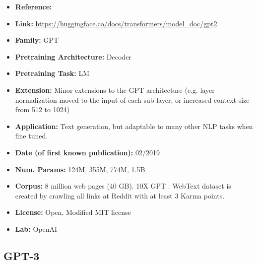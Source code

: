 \documentclass{article}
\begin{document}
            \begin{itemize}
                \item \textbf{Reference:} 
                \item \textbf{Link:} \url{https://huggingface.co/docs/transformers/model_doc/gpt2}
                \item \textbf{Family:} GPT 
                \item \textbf{Pretraining Architecture:} Decoder
                \item \textbf{Pretraining Task:} LM
                \item \textbf{Extension:} Minor extensions to the GPT architecture (e.g. layer normalization moved to the input of each sub-layer, or increased context size from 512 to 1024)  
                \item \textbf{Application:} Text generation, but adaptable to many other NLP tasks when fine tuned.
                \item \textbf{Date (of first known publication):} 02/2019
                \item \textbf{Num. Params:} 124M, 355M, 774M, 1.5B
                \item \textbf{Corpus:} 8 million web pages (40 GB). 10X GPT . WebText dataset is created by crawling all links at Reddit with at least 3 Karma points.
                \item \textbf{License:} Open, Modified MIT license
                \item \textbf{Lab:} OpenAI
            \end{itemize}   

\subsection{GPT-3}
\end{document}
